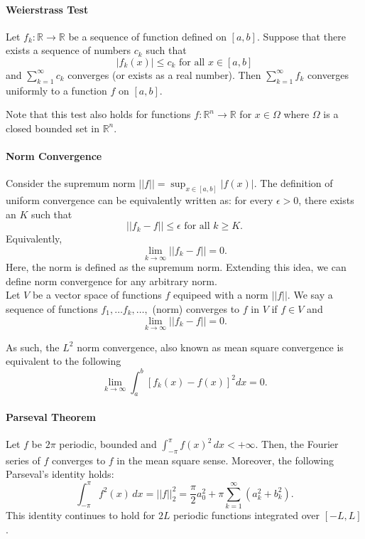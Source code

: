 \paragraph{Weierstrass Test}
Let \(f_k:\mathbb R \to \mathbb R\) be a sequence of function defined on \([a,b]\). Suppose that there exists a sequence of numbers \(c_k\) such that
\[|f_k(x)| \leq c_k \text{ for all } x \in [a,b] \]
and \(\sum_{k=1}^\infty c_k\) converges (or exists as a real number). Then \(\sum_{k=1}^\infty f_k\) converges uniformly to a function \(f\) on \([a,b]\).

Note that this test also holds for functions \(f: \mathbb{R}^n \to \mathbb{R}\) for \(x\in \Omega\) where \(\Omega\) is a closed bounded set in \(\mathbb{R}^n\).

\paragraph{Norm Convergence}
Consider the supremum norm \(||f|| = \sup_{x\in[a,b]} |f(x)|\). The definition of uniform convergence can be equivalently written as:
for every \(\epsilon > 0\), there exists an \(K\) such that
\[
    ||f_k - f|| \leq \epsilon \text{ for all } k \geq K.
\]
Equivalently,
\[\lim_{k\to\infty} ||f_k - f|| = 0.\]
Here, the norm is defined as the supremum norm.
Extending this idea, we can define norm convergence for any arbitrary norm. \\

Let \(V\) be a vector space of functions \(f\) equipeed with a norm \(||f||\). We say a sequence of functions \(f_1, \dots f_k, \dots,\) (norm) converges to \(f\) in \(V\) if \(f\in V\) and 
\[\lim_{k\to\infty} ||f_k - f|| = 0.\] 

As such, the \(L^2\) norm convergence, also known as mean square convergence
is equivalent to the following
\[\lim_{k\to\infty} \int_a^b [f_k(x)-f(x)]^2 dx = 0.\]

\paragraph{Parseval Theorem}
Let \(f\) be \(2\pi\) periodic, bounded and \(\int_{-\pi}^{\pi} f(x)^2 \, dx < +\infty\). Then, the Fourier series of \(f\) converges to \(f\) in the mean square sense. Moreover, the following Parseval's identity holds: 
\[\int_{-\pi}^{\pi} f^2(x) \, dx = ||f||_2^2 = \frac{\pi}{2}a_0^2 + \pi \sum_{k=1}^\infty (a_k^2 + b_k^2).\]
This identity continues to hold for \(2L\) periodic functions integrated over \([-L,L]\).